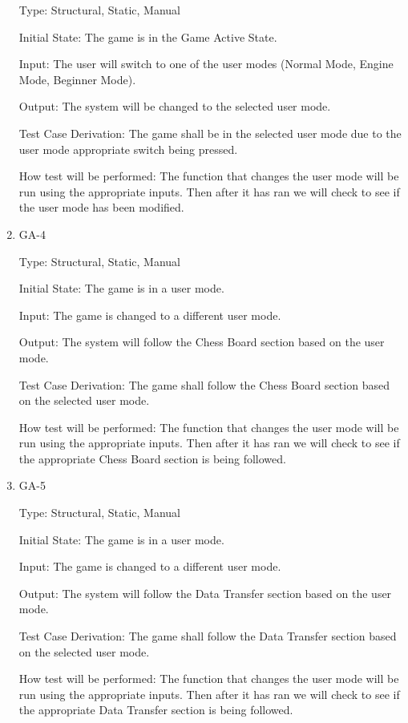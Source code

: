 \documentclass[12pt, titlepage]{article}
\begin{document}
\begin{enumerate}
Type: Structural, Static, Manual
                    
Initial State: The game is in the Game Active State.
                    
Input: The user will switch to one of the user modes (Normal Mode, Engine Mode, Beginner Mode).

Output: The system will be changed to the selected user mode.
                    
Test Case Derivation: The game shall be in the selected user mode due to the user mode appropriate switch being pressed.

How test will be performed: The function that changes the user mode will be run using the appropriate inputs.
Then after it has ran we will check to see if the user mode has been modified.

\item{GA-4\\}

Type: Structural, Static, Manual
                    
Initial State: The game is in a user mode.
                    
Input: The game is changed to a different user mode.

Output: The system will follow the Chess Board section based on the user mode.
                    
Test Case Derivation: The game shall follow the Chess Board section based on the selected user mode.

How test will be performed: The function that changes the user mode will be run using the appropriate inputs.
Then after it has ran we will check to see if the appropriate Chess Board section is being followed.

\item{GA-5\\}

Type: Structural, Static, Manual
                    
Initial State: The game is in a user mode.
                    
Input: The game is changed to a different user mode.

Output: The system will follow the Data Transfer section based on the user mode.
                    
Test Case Derivation: The game shall follow the Data Transfer section based on the selected user mode.

How test will be performed: The function that changes the user mode will be run using the appropriate inputs.
Then after it has ran we will check to see if the appropriate Data Transfer section is being followed.


\end{enumerate}
\end{document}
